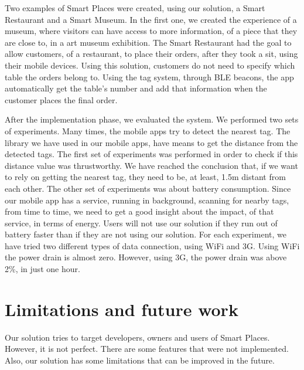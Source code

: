 Two examples of Smart Places were created, using our solution, a Smart Restaurant and a Smart Museum.
In the first one, we created the experience of a museum, where visitors can have access to more information, of a piece that they are close to, in a art museum exhibition.
The Smart Restaurant had the goal to allow customers, of a restaurant, to place their orders, after they took a sit, using their mobile devices.
Using this solution, customers do not need to specify which table the orders belong to. Using the tag system, through \gls{BLE} beacons, the app automatically get the table's number and add that information when the customer places the final order.

After the implementation phase, we evaluated the system.
We performed two sets of experiments.
Many times, the mobile apps try to detect the nearest tag.
The library we have used in our mobile apps, have means to get the distance from the detected tags.
The first set of experiments was performed in order to check if this distance value was thrustworthy.
We have reached the conclusion that, if we want to rely on getting the nearest tag, they need to be, at least, 1.5m distant from each other.
The other set of experiments was about battery consumption.
Since our mobile app has a service, running in background, scanning for nearby tags, from time to time, we need to get a good insight about the impact, of that service, in terms of energy.
Users will not use our solution if they run out of battery faster than if they are not using our solution.
For each experiment, we have tried two different types of data connection, using \gls{WiFi} and \gls{3G}.
Using \gls{WiFi} the power drain is almost zero.
However, using \gls{3G}, the power drain was above 2\%, in just one hour.

\section{Limitations and future work}
\label{sec:conclusion_limitations_and_future_work}
Our solution tries to target developers, owners and users of Smart Places.
However, it is not perfect.
There are some features that were not implemented. Also, our solution has some limitations that can be improved in the future.

